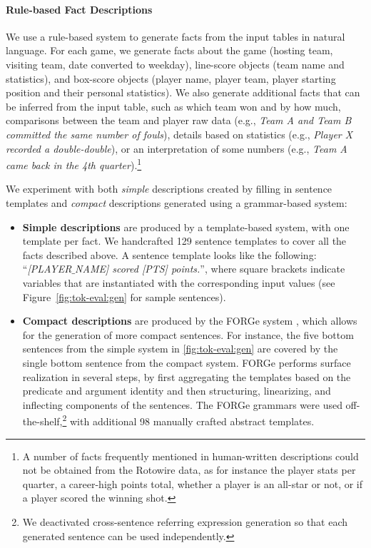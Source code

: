 

\paragraph{Rule-based Fact Descriptions}
We use a rule-based system to generate facts from the input tables in natural language. For each game, we generate facts about the game (hosting team, visiting team, date converted to weekday), line-score objects (team name and statistics), and box-score objects (player name, player team, player starting position and their personal statistics). We also generate additional facts that can be inferred from the input table, such as which team won and by how much, comparisons between the team and player raw data (e.g., \emph{Team A and Team B committed the same number of fouls}), details based on statistics (e.g., \emph{Player X recorded a double-double}), or an interpretation of some numbers (e.g., \emph{Team A came back in the 4th quarter}).\footnote{A number of facts frequently mentioned in human-written descriptions could not be obtained from the Rotowire data, as for instance the player stats per quarter, a career-high points total, whether a player is an all-star or not, or if a player scored the winning shot.}

We experiment with both \emph{simple} descriptions created by filling in sentence templates and \emph{compact} descriptions generated using a grammar-based system:
\begin{itemize}
    \item \textbf{Simple descriptions} are produced by a template-based system, with one template per fact. We handcrafted 129 sentence templates to cover all the facts described above. A sentence template looks like the following: ``\textit{[PLAYER$\_$NAME] scored [PTS] points.}'', where square brackets indicate variables that are instantiated with the corresponding input values (see Figure~\ref{fig:tok-eval:gen} for sample sentences).
    \item  \textbf{Compact descriptions} are produced by the FORGe system \cite{mille2019teaching}, which allows for the generation of more compact sentences.  For instance, the five bottom sentences from the simple system in \autoref{fig:tok-eval:gen} are covered by the single bottom sentence from the compact system. FORGe performs surface realization in several steps, by first aggregating the templates based on the predicate and argument identity and then structuring, linearizing, and inflecting components of the sentences. The FORGe grammars were used off-the-shelf,\footnote{We deactivated cross-sentence referring expression generation so that each generated sentence can be used independently.} with additional 98 manually crafted abstract templates.
\end{itemize}

